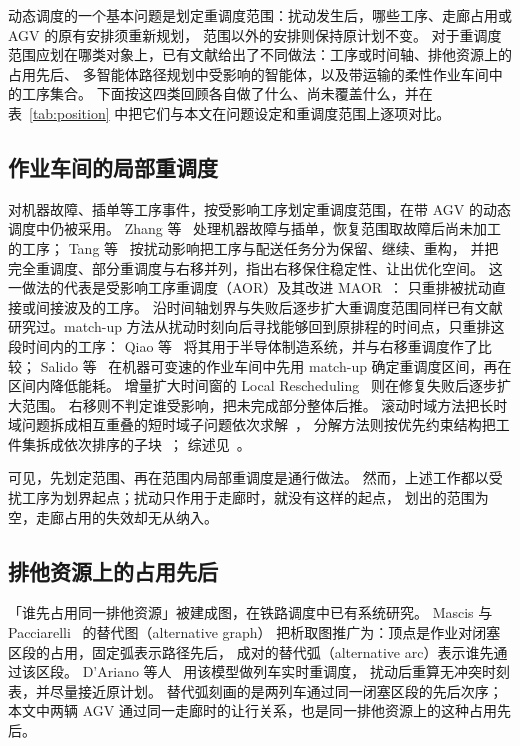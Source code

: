 \documentclass[manuscript,screen,review]{acmart}
\begin{document}

动态调度的一个基本问题是划定重调度范围：扰动发生后，哪些工序、走廊占用或 AGV 的原有安排须重新规划，
范围以外的安排则保持原计划不变。
对于重调度范围应划在哪类对象上，已有文献给出了不同做法：工序或时间轴、排他资源上的占用先后、
多智能体路径规划中受影响的智能体，以及带运输的柔性作业车间中的工序集合。
下面按这四类回顾各自做了什么、尚未覆盖什么，并在表~\ref{tab:position} 中把它们与本文在问题设定和重调度范围上逐项对比。

\subsection{作业车间的局部重调度}
\label{sec:rw_aor}

对机器故障、插单等工序事件，按受影响工序划定重调度范围，在带 AGV 的动态调度中仍被采用。
Zhang 等~\cite{zhang2023energy} 处理机器故障与插单，恢复范围取故障后尚未加工的工序；
Tang 等~\cite{tang2026dynamic} 按扰动影响把工序与配送任务分为保留、继续、重构，
并把完全重调度、部分重调度与右移并列，指出右移保住稳定性、让出优化空间。
这一做法的代表是受影响工序重调度（AOR）及其改进 MAOR~\cite{subramaniam2003maor}：
只重排被扰动直接或间接波及的工序。
沿时间轴划界与失败后逐步扩大重调度范围同样已有文献研究过。match-up 方法从扰动时刻向后寻找能够回到原排程的时间点，只重排这段时间内的工序：
Qiao 等~\cite{qiao2012single} 将其用于半导体制造系统，并与右移重调度作了比较；
Salido 等~\cite{salido2017rescheduling} 在机器可变速的作业车间中先用 match-up 确定重调度区间，再在区间内降低能耗。
增量扩大时间窗的 Local Rescheduling~\cite{kuster2007local} 则在修复失败后逐步扩大范围。
右移则不判定谁受影响，把未完成部分整体后推。
滚动时域方法把长时域问题拆成相互重叠的短时域子问题依次求解~\cite{li2025learning}，
分解方法则按优先约束结构把工件集拆成依次排序的子块~\cite{margot2003decompositions}；
综述见~\cite{vieira2003rescheduling,ouelhadj2009survey}。

可见，先划定范围、再在范围内局部重调度是通行做法。
然而，上述工作都以受扰工序为划界起点；扰动只作用于走廊时，就没有这样的起点，
划出的范围为空，走廊占用的失效却无从纳入。

\subsection{排他资源上的占用先后}
\label{sec:rw_ag}

「谁先占用同一排他资源」被建成图，在铁路调度中已有系统研究。
Mascis 与 Pacciarelli~\cite{mascis2002alternative} 的替代图（alternative graph）
把析取图推广为：顶点是作业对闭塞区段的占用，固定弧表示路径先后，
成对的替代弧（alternative arc）表示谁先通过该区段。
D'Ariano 等人~\cite{dariano2007branch} 用该模型做列车实时重调度，
扰动后重算无冲突时刻表，并尽量接近原计划。
替代弧刻画的是两列车通过同一闭塞区段的先后次序；
本文中两辆 AGV 通过同一走廊时的让行关系，也是同一排他资源上的这种占用先后。
\end{document}
